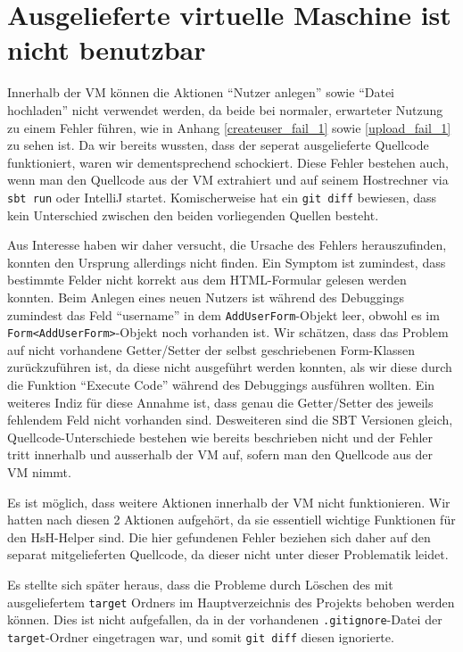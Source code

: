 \documentclass[12pt,DIV14,BCOR10mm,a4paper,parskip=half-,headsepline,headinclude,english,ngerman,bibliography=totocnumbered]{scrreprt}
\begin{document}
\vspace*{-3cm}

\tableofcontents  %

\chapter{Ausgelieferte virtuelle Maschine ist nicht benutzbar}

Innerhalb der VM können die Aktionen \enquote{Nutzer anlegen} sowie \enquote{Datei hochladen} nicht verwendet werden, da beide bei normaler, erwarteter Nutzung zu einem Fehler führen, wie in Anhang \ref{createuser_fail_1} sowie \ref{upload_fail_1} zu sehen ist.
Da wir bereits wussten, dass der seperat ausgelieferte Quellcode funktioniert, waren wir dementsprechend schockiert.
Diese Fehler bestehen auch, wenn man den Quellcode aus der VM extrahiert und auf seinem Hostrechner via \texttt{sbt run} oder IntelliJ startet.
Komischerweise hat ein \texttt{git diff} bewiesen, dass kein Unterschied zwischen den beiden vorliegenden Quellen besteht.

Aus Interesse haben wir daher versucht, die Ursache des Fehlers herauszufinden, konnten den Ursprung allerdings nicht finden.
Ein Symptom ist zumindest, dass bestimmte Felder nicht korrekt aus dem HTML-Formular gelesen werden konnten.
Beim Anlegen eines neuen Nutzers ist während des Debuggings zumindest das Feld \enquote{username} in dem \texttt{AddUserForm}-Objekt leer, obwohl es im \texttt{Form<AddUserForm>}-Objekt noch vorhanden ist.
Wir schätzen, dass das Problem auf nicht vorhandene Getter/Setter der selbst geschriebenen Form-Klassen zurückzuführen ist, da diese nicht ausgeführt werden konnten, als wir diese durch die Funktion \enquote{Execute Code} während des Debuggings ausführen wollten.
Ein weiteres Indiz für diese Annahme ist, dass genau die Getter/Setter des jeweils fehlendem Feld nicht vorhanden sind.
Desweiteren sind die SBT Versionen gleich, Quellcode-Unterschiede bestehen wie bereits beschrieben nicht und der Fehler tritt innerhalb und ausserhalb der VM auf, sofern man den Quellcode aus der VM nimmt.

Es ist möglich, dass weitere Aktionen innerhalb der VM nicht funktionieren. Wir hatten nach diesen 2 Aktionen aufgehört, da sie essentiell wichtige Funktionen für den HsH-Helper sind.
Die hier gefundenen Fehler beziehen sich daher auf den separat mitgelieferten Quellcode, da dieser nicht unter dieser Problematik leidet.

Es stellte sich später heraus, dass die Probleme durch Löschen des mit ausgeliefertem \texttt{target} Ordners im Hauptverzeichnis des Projekts behoben werden können.
Dies ist nicht aufgefallen, da in der vorhandenen \texttt{.gitignore}-Datei der \texttt{target}-Ordner eingetragen war, und somit \texttt{git diff} diesen ignorierte.
\end{document}
